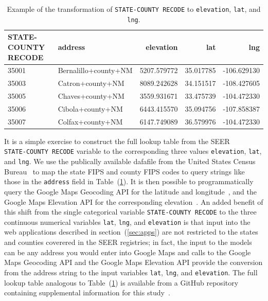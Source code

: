 \documentclass[a4paper,11pt]{article}
\newcommand{\codewhite}[1]{\colorbox{white}{\texttt{#1}}}
\begin{document}
\begin{table}[tbp]
\begin{center}
\begin{tabular}{llrrr}
\toprule
 STATE-COUNTY RECODE &               address &    elevation &        lat &         lng \\
\midrule
35001 &  Bernalillo+county+NM &  5207.579772 &  35.017785 & -106.629130 \\
35003 &      Catron+county+NM &  8089.242628 &  34.151517 & -108.427605 \\
35005 &      Chaves+county+NM &  3559.931671 &  33.475739 & -104.472330 \\
35006 &      Cibola+county+NM &  6443.415570 &  35.094756 & -107.858387 \\
35007 &      Colfax+county+NM &  6147.749089 &  36.579976 & -104.472330 \\
\bottomrule
\end{tabular}
\caption{\label{tab:nmhead} Example of the transformation of \codewhite{STATE-COUNTY RECODE} to \codewhite{elevation}, \codewhite{lat}, and \codewhite{lng}.}
\end{center}
\end{table}

It is a simple exercise to construct the full lookup table from the SEER \\  \codewhite{STATE-COUNTY RECODE} variable to the corresponding three values \codewhite{elevation}, \codewhite{lat}, and \codewhite{lng}. We use the publically available dafafile from the United States Census Bureau~\cite{census} to map the state FIPS and county FIPS codes to query strings like those in the \codewhite{address} field in Table~(\ref{tab:nmhead}). 
It is then possible to programmatically query the Google Maps Geocoding API for the latitude and longitude~\cite{geocode}, and the Google Maps Elevation API for the corresponding elevation~\cite{elevation}.
An added benefit of this shift from the single categorical variable \codewhite{STATE-COUNTY RECODE} to the three continuous numerical variables \codewhite{lat}, \codewhite{lng}, and \codewhite{elevation} is that input into the web applications described in section~(\ref{sec:apps}) are not restricted to the states and counties coverered in the SEER registries; in fact, the input to the models can be any address you would enter into Google Maps and calls to the Google Maps Geocoding API and the Google Maps Elevation API provide the conversion from the address string to the input variables \codewhite{lat}, \codewhite{lng}, and \codewhite{elevation}. The full lookup table analogous to Table~(\ref{tab:nmhead}) is available from a GitHub repository containing supplemental information for this study~\cite{supp}. 
\end{document}
